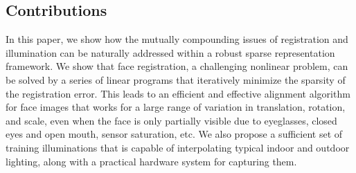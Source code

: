 \documentclass[12pt,journal,draftcls,letterpaper,onecolumn]{IEEEtran}
\begin{document}
\subsection{Contributions} In this paper, we show how the 
mutually compounding issues of registration and illumination
can be naturally addressed within a robust sparse representation
framework. We show that face registration, a challenging
nonlinear problem, can be solved by a series of linear programs
that iteratively minimize the sparsity of the registration
error. This leads to an efficient and effective alignment
algorithm for face images that works for a large range of
variation in translation, rotation, and scale, even when
the face is only partially visible due to eyeglasses, closed
eyes and open mouth, sensor saturation, etc.  We also propose a
sufficient set of training illuminations
that is capable of interpolating typical indoor and outdoor
lighting, along with a practical hardware system for capturing
them.




\end{document}
